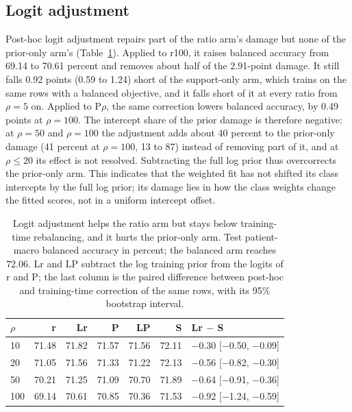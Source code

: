 \subsection{Logit adjustment}
\label{sec:adjustment-results}
Post-hoc logit adjustment repairs part of the ratio arm's damage but none of the prior-only arm's (Table~\ref{tab:adjustment}). Applied to r100, it raises balanced accuracy from 69.14 to 70.61 percent and removes about half of the 2.91-point damage. It still falls 0.92 points (0.59 to 1.24) short of the support-only arm, which trains on the same rows with a balanced objective, and it falls short of it at every ratio from $\rho=5$ on. Applied to P$\rho$, the same correction lowers balanced accuracy, by 0.49 points at $\rho=100$. The intercept share of the prior damage is therefore negative: at $\rho=50$ and $\rho=100$ the adjustment adds about 40 percent to the prior-only damage (41 percent at $\rho=100$, 13 to 87) instead of removing part of it, and at $\rho\leq20$ its effect is not resolved. Subtracting the full log prior thus overcorrects the prior-only arm. This indicates that the weighted fit has not shifted its class intercepts by the full log prior; its damage lies in how the class weights change the fitted scores, not in a uniform intercept offset.

\begin{table}[htbp]
\centering
\renewcommand{\arraystretch}{1.15}
\begin{tabular}{@{}lrrrrrl@{}}
\toprule
$\rho$ & r & Lr & P & LP & S & Lr $-$ S \\
\midrule
10 & 71.48 & 71.82 & 71.57 & 71.56 & 72.11 & $-$0.30 [$-$0.50, $-$0.09] \\
20 & 71.05 & 71.56 & 71.33 & 71.22 & 72.13 & $-$0.56 [$-$0.82, $-$0.30] \\
50 & 70.21 & 71.25 & 71.09 & 70.70 & 71.89 & $-$0.64 [$-$0.91, $-$0.36] \\
100 & 69.14 & 70.61 & 70.85 & 70.36 & 71.53 & $-$0.92 [$-$1.24, $-$0.59] \\
\bottomrule
\end{tabular}
\caption{Logit adjustment helps the ratio arm but stays below training-time rebalancing, and it hurts the prior-only arm. Test patient-macro balanced accuracy in percent; the balanced arm reaches 72.06. Lr and LP subtract the log training prior from the logits of r and P; the last column is the paired difference between post-hoc and training-time correction of the same rows, with its 95\% bootstrap interval.}
\label{tab:adjustment}
\end{table}

